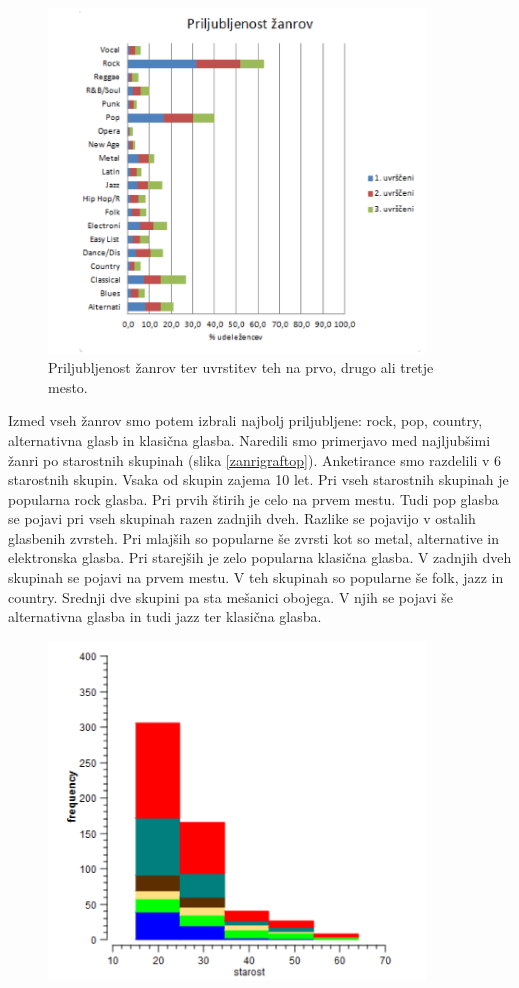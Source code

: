 \documentclass[a4paper, 12pt]{book}
\begin{document}
{\begin{figure}[hbt]
\centering
\includegraphics[width=10cm]{images/genre.png}

\caption{Priljubljenost žanrov ter uvrstitev teh na prvo, drugo ali tretje mesto.  }
\label{zanrigraf}
\end{figure}

Izmed vseh žanrov smo potem izbrali najbolj priljubljene: rock, pop, country, alternativna glasb in klasična glasba. Naredili smo primerjavo med najljubšimi žanri po starostnih skupinah (slika \ref{zanrigraftop}). Anketirance smo razdelili v 6 starostnih skupin. Vsaka od skupin zajema 10 let. Pri vseh starostnih skupinah je popularna rock glasba. Pri prvih štirih je celo na prvem mestu. Tudi pop glasba se pojavi pri vseh skupinah razen zadnjih dveh. Razlike se pojavijo v ostalih glasbenih zvrsteh. Pri mlajših so popularne še zvrsti kot so metal, alternative in elektronska glasba. Pri starejših je zelo popularna klasična glasba. V zadnjih dveh skupinah se pojavi na prvem mestu. V teh skupinah so popularne še folk, jazz in country. Srednji dve skupini pa sta mešanici obojega. V njih se pojavi še alternativna glasba in tudi jazz ter klasična glasba. 

\begin{figure}[hbt]
\centering
\includegraphics[width=10cm]{images/genretop.png}


\end{figure}}
\end{document}
